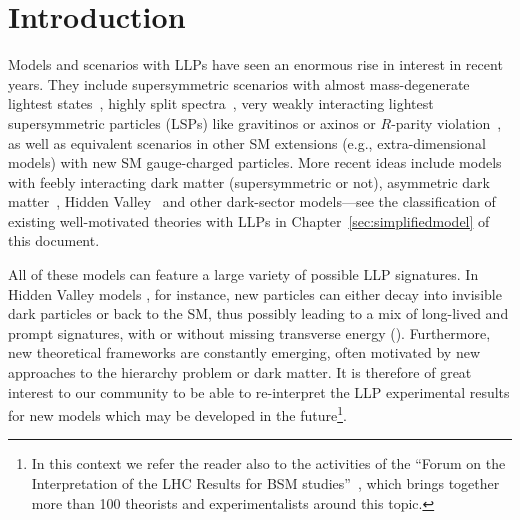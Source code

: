 
\section{Introduction}
\label{sec:ch5-introduction}

Models and scenarios with LLPs have seen an enormous rise in interest in recent years.
They include supersymmetric scenarios with almost mass-degenerate lightest states~\cite{Chen:1995yu,Feng:1999fu}, 
highly split spectra~\cite{ArkaniHamed:2004fb,Giudice:2004tc}, very weakly interacting 
lightest supersymmetric particles (LSPs) like gravitinos or 
axinos \cite{Pagels:1981ke,Covi:1999ty} or $R$-parity violation~\cite{Barbier:2004ez}, 
as well as equivalent scenarios in other SM extensions (e.g., extra-dimensional models) with new SM gauge-charged particles. 
More recent ideas include models with feebly interacting dark matter \cite{Hall:2009bx} (supersymmetric or not), asymmetric dark matter~\cite{Zurek:2013wia}, Hidden Valley~\cite{Strassler:2006im} and other dark-sector models---see the classification of existing well-motivated theories with LLPs in Chapter~\ref{sec:simplifiedmodel} of this document.

All of these models can feature a large variety of possible LLP signatures. In Hidden Valley models \cite{Strassler:2006im}, for instance,   
new particles can either decay into invisible dark particles or back to the SM, thus possibly leading to a 
mix of long-lived and prompt signatures, with or without missing transverse energy (\MET). 
Furthermore, new theoretical frameworks are constantly emerging, often motivated by 
new approaches to the hierarchy problem or dark matter. 
It is therefore of great interest to our community to be able to 
re-interpret the LLP experimental results 
for new models which may be developed in the future\footnote{In this context we refer the reader also to 
the activities of the ``Forum on the Interpretation of the LHC Results for BSM studies''~\cite{reinterpretationForum}, which brings together more than 100 theorists and experimentalists around this topic.}.

